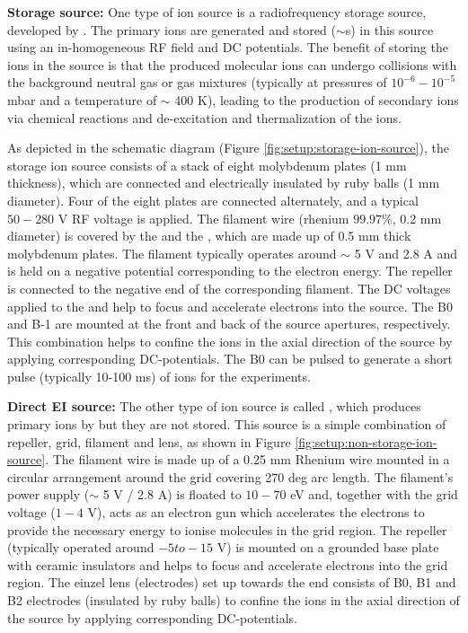 \textbf{Storage source:} One type of ion source is a radiofrequency storage source, developed by \citet{gerlich_experimental_1992}. The primary ions are generated and stored ($\sim $s) in this source using an in-homogeneous RF field and DC potentials. The benefit of storing the ions in the source is that the produced molecular ions can undergo collisions with the background neutral gas or gas mixtures (typically at pressures of $10^{-6} - 10^{-5}$ mbar and a temperature of $\sim$ 400 K), leading to the production of secondary ions via chemical reactions and de-excitation and thermalization of the ions. 

As depicted in the schematic diagram (Figure \ref{fig:setup:storage-ion-source}), the storage ion source consists of a stack of eight  molybdenum plates (1 mm thickness), which are connected and electrically insulated by ruby balls (1 mm diameter). Four of the eight plates are connected alternately, and a typical $50-280$ V RF voltage is applied. The filament wire (rhenium $99.97 \%$, 0.2 mm diameter) is covered by the  and the , which are made up of 0.5 mm thick molybdenum plates. The filament typically operates around $\sim$ 5 V and 2.8 A and is held on a negative potential corresponding to the electron energy. The repeller is connected to the negative end of the corresponding filament. The DC voltages applied to the  and  help to focus and accelerate electrons into the source. The B0 and B-1 are mounted at the front and back of the source apertures, respectively. This combination helps to confine the ions in the axial direction of the source by applying corresponding DC-potentials. The B0 can be pulsed to generate a short pulse (typically 10-100 ms) of ions for the experiments.

\textbf{Direct EI source:} The other type of ion source is called , which produces primary ions by  but they are not stored. This source is a simple combination of repeller, grid, filament and lens, as shown in Figure \ref{fig:setup:non-storage-ion-source}. The filament wire is made up of a 0.25 mm Rhenium wire mounted in a circular arrangement around the grid covering 270 deg arc length. The filament's power supply ($\sim$ 5 V / 2.8 A) is floated to $10-70$ eV and, together with the grid voltage ($1-4$ V), acts as an electron gun which accelerates the electrons to provide the necessary energy to ionise molecules in the grid region. The repeller (typically operated around $-5 to -15$ V) is mounted on a grounded base plate with ceramic insulators and helps to focus and accelerate electrons into the grid region. The einzel lens (electrodes) set up towards the end consists of B0, B1 and B2 electrodes (insulated by ruby balls) to confine the ions in the axial direction of the source by applying corresponding DC-potentials.

